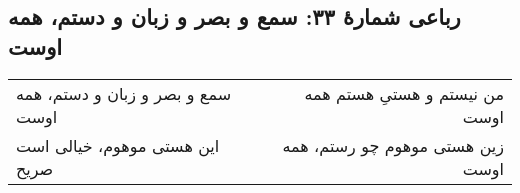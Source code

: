 \begin{center}
\section*{رباعی شمارهٔ ۳۳: سمع و بصر و زبان و دستم، همه اوست}
\label{sec:033}
\begin{longtable}{l p{0.5cm} r}
سمع و بصر و زبان و دستم، همه اوست
&&
من نیستم و هستیِ هستم  همه اوست
\\
این هستی موهوم، خیالی است صریح
&&
زین هستی موهوم چو رستم، همه اوست
\\
\end{longtable}
\end{center}
